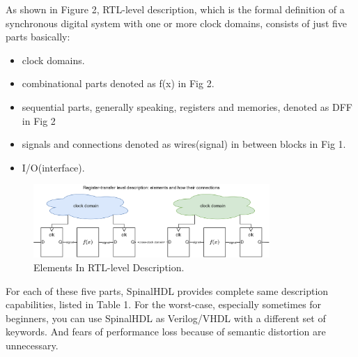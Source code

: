 \documentclass{article}
\begin{document}
As shown in Figure 2, RTL-level description, which is the formal definition of a synchronous digital system with one or more clock domains, consists of just five parts basically:
\begin{itemize}
\item clock domains.
\item combinational parts denoted as f(x) in Fig 2.
\item sequential parts, generally speaking, registers and memories, denoted as DFF in Fig 2
\item signals and connections denoted as wires(signal) in between blocks in Fig 1.
\item I/O(interface).
\end{itemize}

\begin{figure}[hbt]
\centering
\includegraphics[width=0.8\textwidth]{RTL_element.png}
\caption{\label{fig:RTL_element}Elements In RTL-level Description.}
\end{figure}

For each of these five parts, SpinalHDL provides complete same description capabilities, listed in Table 1. For the worst-case, especially sometimes for beginners, you can use SpinalHDL as Verilog/VHDL with a different set of keywords. And fears of performance loss because of semantic distortion are unnecessary.
\end{document}
